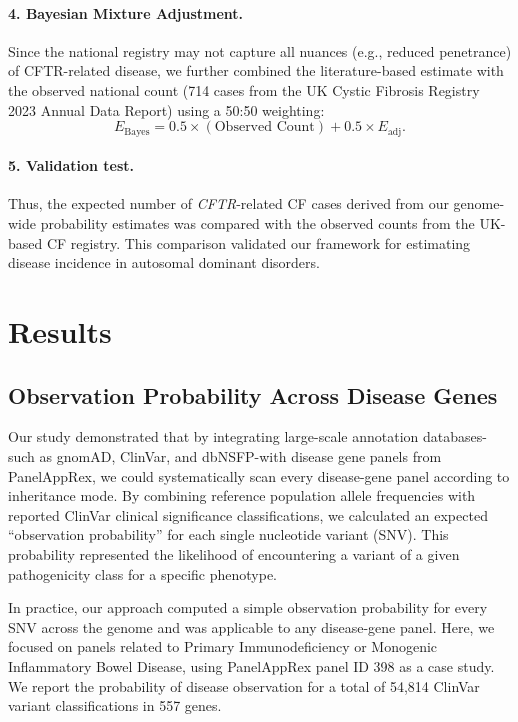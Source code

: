 \paragraph{4. Bayesian Mixture Adjustment.}
Since the national registry may not capture all nuances (e.g., reduced penetrance) of CFTR-related disease, we further combined the literature-based estimate with the observed national count (714 cases from the UK Cystic Fibrosis Registry 2023 Annual Data Report) using a 50:50 weighting:
\[
E_{\text{Bayes}} = 0.5 \times (\text{Observed Count}) + 0.5 \times E_{\text{adj}}.
\]

\paragraph{5. Validation test.}
Thus, the expected number of \textit{CFTR}-related CF cases derived from our genome-wide probability estimates was compared with the observed counts from the UK-based CF registry. This comparison validated our framework for estimating disease incidence in autosomal dominant disorders.

\section{Results}

\subsection{Observation Probability Across Disease Genes}

Our study demonstrated that by integrating large-scale annotation databases-such as gnomAD, ClinVar, and dbNSFP-with disease gene panels from PanelAppRex, we could systematically scan every disease-gene panel according to inheritance mode. By combining reference population allele frequencies with reported ClinVar clinical significance classifications, we calculated an expected ``observation probability'' for each single nucleotide variant (SNV). This probability represented the likelihood of encountering a variant of a given pathogenicity class for a specific phenotype.

In practice, our approach computed a simple observation probability for every SNV across the genome and was applicable to any disease-gene panel. Here, we focused on panels related to Primary Immunodeficiency or Monogenic Inflammatory Bowel Disease, using PanelAppRex panel ID 398 as a case study.
We report the probability of disease observation for a total of 54,814 ClinVar variant classifications in 557 genes.

